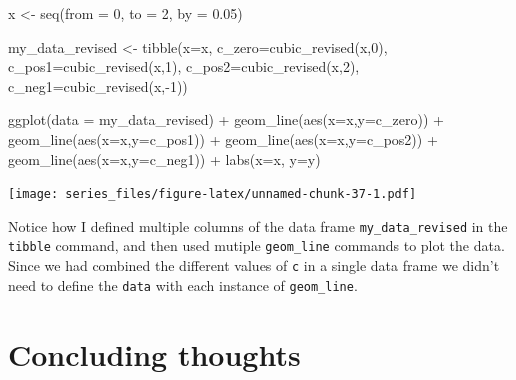 \documentclass[
]{book}
\newenvironment{Shaded}{\begin{snugshade}}{\end{snugshade}}
\newcommand{\AttributeTok}[1]{\textcolor[rgb]{0.77,0.63,0.00}{#1}}
\newcommand{\DecValTok}[1]{\textcolor[rgb]{0.00,0.00,0.81}{#1}}
\newcommand{\FloatTok}[1]{\textcolor[rgb]{0.00,0.00,0.81}{#1}}
\newcommand{\FunctionTok}[1]{\textcolor[rgb]{0.00,0.00,0.00}{#1}}
\newcommand{\NormalTok}[1]{#1}
\newcommand{\OtherTok}[1]{\textcolor[rgb]{0.56,0.35,0.01}{#1}}
\newcommand{\SpecialCharTok}[1]{\textcolor[rgb]{0.00,0.00,0.00}{#1}}
\newcommand{\StringTok}[1]{\textcolor[rgb]{0.31,0.60,0.02}{#1}}
\theoremstyle{definition}
\theoremstyle{definition}
\theoremstyle{definition}
\theoremstyle{remark}
\begin{document}
\begin{Shaded}
\begin{Highlighting}[]
\NormalTok{x }\OtherTok{\textless{}{-}} \FunctionTok{seq}\NormalTok{(}\AttributeTok{from =} \DecValTok{0}\NormalTok{, }\AttributeTok{to =} \DecValTok{2}\NormalTok{, }\AttributeTok{by =} \FloatTok{0.05}\NormalTok{)}


\NormalTok{my\_data\_revised }\OtherTok{\textless{}{-}} \FunctionTok{tibble}\NormalTok{(}\AttributeTok{x=}\NormalTok{x,}
                  \AttributeTok{c\_zero=}\FunctionTok{cubic\_revised}\NormalTok{(x,}\DecValTok{0}\NormalTok{),}
                  \AttributeTok{c\_pos1=}\FunctionTok{cubic\_revised}\NormalTok{(x,}\DecValTok{1}\NormalTok{),}
                  \AttributeTok{c\_pos2=}\FunctionTok{cubic\_revised}\NormalTok{(x,}\DecValTok{2}\NormalTok{),}
                  \AttributeTok{c\_neg1=}\FunctionTok{cubic\_revised}\NormalTok{(x,}\SpecialCharTok{{-}}\DecValTok{1}\NormalTok{))}

\FunctionTok{ggplot}\NormalTok{(}\AttributeTok{data =}\NormalTok{ my\_data\_revised) }\SpecialCharTok{+}
  \FunctionTok{geom\_line}\NormalTok{(}\FunctionTok{aes}\NormalTok{(}\AttributeTok{x=}\NormalTok{x,}\AttributeTok{y=}\NormalTok{c\_zero)) }\SpecialCharTok{+}
  \FunctionTok{geom\_line}\NormalTok{(}\FunctionTok{aes}\NormalTok{(}\AttributeTok{x=}\NormalTok{x,}\AttributeTok{y=}\NormalTok{c\_pos1)) }\SpecialCharTok{+}
  \FunctionTok{geom\_line}\NormalTok{(}\FunctionTok{aes}\NormalTok{(}\AttributeTok{x=}\NormalTok{x,}\AttributeTok{y=}\NormalTok{c\_pos2)) }\SpecialCharTok{+}
  \FunctionTok{geom\_line}\NormalTok{(}\FunctionTok{aes}\NormalTok{(}\AttributeTok{x=}\NormalTok{x,}\AttributeTok{y=}\NormalTok{c\_neg1)) }\SpecialCharTok{+}
  \FunctionTok{labs}\NormalTok{(}\AttributeTok{x=}\StringTok{\textquotesingle{}x\textquotesingle{}}\NormalTok{,}
         \AttributeTok{y=}\StringTok{\textquotesingle{}y\textquotesingle{}}\NormalTok{)}
\end{Highlighting}
\end{Shaded}

\texttt{[image: series\_files/figure-latex/unnamed-chunk-37-1.pdf]}

Notice how I defined multiple columns of the data frame \texttt{my\_data\_revised} in the \texttt{tibble} command, and then used mutiple \texttt{geom\_line} commands to plot the data. Since we had combined the different values of \texttt{c} in a single data frame we didn't need to define the \texttt{data} with each instance of \texttt{geom\_line}.

\hypertarget{concluding-thoughts}{%
\section{Concluding thoughts}\label{concluding-thoughts}}
\end{document}
